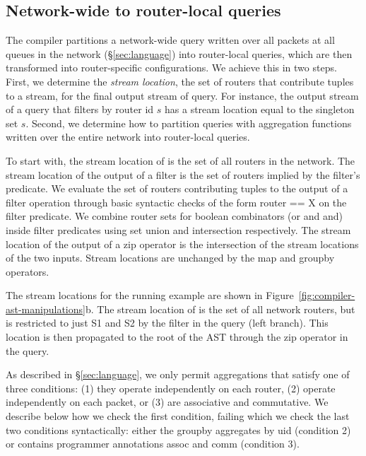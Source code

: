 \subsection{Network-wide to router-local queries}
\label{sec:network-to-router-local}

The compiler partitions a network-wide query written over all packets at all
queues in the network (\S\ref{sec:language}) into router-local queries, which
are then transformed into router-specific configurations. We achieve this in
two steps. First, we determine the {\em stream location}, \ie the set of
routers that contribute tuples to a stream, for the final output stream of
query. For instance, the output stream of a query that filters by router id $s$
has a stream location equal to the singleton set $s$. Second, we determine how
to partition queries with aggregation functions written over the entire network
into router-local queries.

 To start with,
the stream location of {\ct \pktlog} is the set of all routers in the network.
The stream location of the output of a {\ct filter} is the set of routers
implied by the filter's predicate. We evaluate the set of routers contributing
tuples to the output of a {\ct filter} operation through basic syntactic checks
of the form {\ct router == X} on the {\ct filter} predicate.  We combine router
sets for boolean combinators ({\ct or} and {\ct and}) inside filter predicates
using set union and intersection respectively.  The stream location of the
output of a {\ct zip} operator is the intersection of the stream locations of
the two inputs.  Stream locations are unchanged by the {\ct map} and {\ct
groupby} operators.

The stream locations for the running example are shown in
Figure~\ref{fig:compiler-ast-manipulations}b. The stream location of {\ct \pktlog} is the
set of all network routers, but is restricted to just {\ct S1} and {\ct S2} by
the {\ct filter} in the query (left branch). This location is then propagated
to the root of the AST through the {\ct zip} operator in the query.

As described in \S\ref{sec:language}, we only permit aggregations that satisfy
one of three conditions: (1) they operate independently on each router, (2)
operate independently on each packet, or (3) are associative and commutative.
We describe below how we check the first condition, failing which we check the
last two conditions syntactically: either the {\ct groupby} aggregates by {\ct
uid} (condition 2) or contains programmer annotations {\ct assoc} and {\ct
comm} (condition 3).


